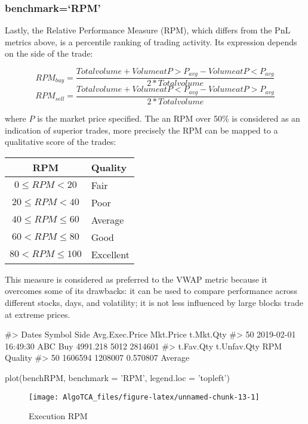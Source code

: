 \hypertarget{benchmarkrpm}{%
\subsubsection{benchmark=`RPM'}\label{benchmarkrpm}}

Lastly, the Relative Performance Measure (RPM), which differs from the
PnL metrics above, is a percentile ranking of trading activity. Its
expression depends on the side of the trade:

\[ RPM_{buy} = \frac{Total volume + Volume at P > P_{avg} - Volume at P < P_{avg}}{2 * Total volume} \]
\[ RPM_{sell} = \frac{Total volume + Volume at P < P_{avg} - Volume at P > P_{avg}}{2 * Total volume} \]

where \(P\) is the market price specified. The an RPM over 50\% is
considered as an indication of superior trades, more precisely the RPM
can be mapped to a qualitative score of the trades:

\begin{center}
\begin{tabular}{ c l }
RPM                     & Quality   \\
\hline
$ 0 \leq RPM < 20 $     & Fair      \\
$ 20 \leq RPM < 40 $      & Poor      \\
$ 40 \leq RPM \leq 60 $ & Average   \\
$ 60 < RPM \leq 80 $      & Good      \\
$ 80 < RPM \leq 100 $   & Excellent \\
\end{tabular}
\end{center}

This measure is considered as preferred to the VWAP metric because it
overcomes some of its drawbacks: it can be used to compare performance
across different stocks, days, and volatility; it is not less influenced
by large blocks trade at extreme prices.

\begin{Schunk}
\begin{Soutput}
#>                  Dates Symbol Side Avg.Exec.Price Mkt.Price t.Mkt.Qty
#> 50 2019-02-01 16:49:30    ABC  Buy       4991.218      5012   2814601
#>    t.Fav.Qty t.Unfav.Qty      RPM Quality
#> 50   1606594     1208007 0.570807 Average
\end{Soutput}
\begin{Sinput}
plot(benchRPM, benchmark = 'RPM', legend.loc = 'topleft')
\end{Sinput}
\begin{figure}

{\centering \texttt{[image: AlgoTCA\_files/figure-latex/unnamed-chunk-13-1]} 

}

\caption[Execution RPM]{Execution RPM}\label{fig:unnamed-chunk-13}
\end{figure}
\end{Schunk}

